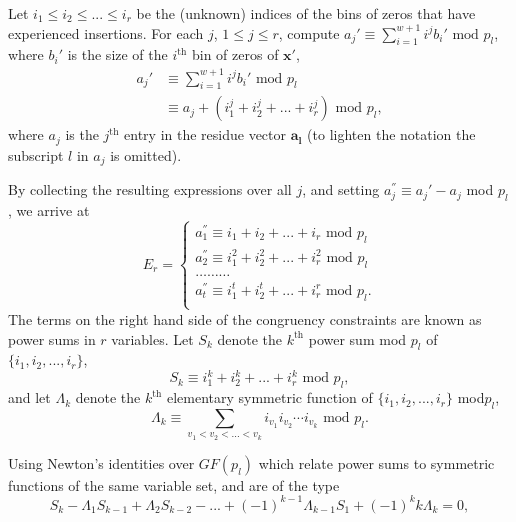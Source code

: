 \documentclass[12pt]{article} \pagestyle{plain} \topmargin
\begin{document}
Let $i_1 \leq i_2 \leq ... \leq i_r$ be the (unknown) indices of the
bins of zeros that have experienced insertions. For each $j$, $1\leq
j \leq r$, compute $a_j'\equiv \sum_{i=1}^{w+1} i^jb_i' \text{ mod }
p_l$, where $b_i'$ is the size of the $i^{\text{th}}$ bin of zeros
of $\mathbf{x'}$,
\begin{equation}\begin{array}{ll}
a_j'& \equiv \sum_{i=1}^{w+1} i^jb_i' \text{ mod } p_l\\
{}  & \equiv a_j + (i_1^j+i_2^j+...+i_r^j) \text{ mod }p_l,
\end{array}
\end{equation}
where $a_j$ is the $j^{\text{th}}$ entry in the residue vector
$\mathbf{a_l}$ (to lighten the notation the subscript $l$ in $a_j$
is omitted).

By collecting the resulting expressions over all $j$, and setting
$a_j^{''} \equiv a_j'-a_j$ mod $p_l$, we arrive at
\begin{equation}
E_r=\left\{
\begin{array}{ll}
a_1^{''} \equiv i_1+i_2+...+i_r \text{ mod }p_l\\
a_2^{''} \equiv i_1^2+i_2^2+...+i_r^2 \text{ mod }p_l\\
\dots \dots \dots\\
a_t^{''} \equiv i_1^t+i_2^t+...+i_r^r \text{ mod }p_l.\\
\end{array} \right.
\end{equation}
The terms on the right hand side of the congruency constraints are
known as power sums in $r$ variables. Let $S_k$ denote the
$k^{\text{th}}$ power sum mod $p_l$ of $\{i_1,i_2,...,i_r\}$,
\begin{equation}
S_k\equiv i_1^k+i_2^k+...+i_r^k \text{ mod }p_l,
\end{equation}
and let $\Lambda_k$ denote the $k^{\text{th}}$ elementary symmetric
function of  $\{i_1,i_2,...,i_r\}$ mod$p_l$,
\begin{equation}
\Lambda_k \equiv \sum_{v_1<v_2<...<v_k} i_{v_1}i_{v_2}\cdots
i_{v_k} \text{ mod } p_l.
\end{equation}

Using Newton's identities over $GF(p_l)$ which relate power sums
to symmetric functions of the same variable set, and are of the
type
\begin{equation}\label{newton}
S_k-\Lambda_{1}S_{k-1}+\Lambda_{2}S_{k-2}-...+(-1)^{k-1}\Lambda_{k-1}S_{1}+(-1)^kk\Lambda_{k}
=0,
\end{equation}
\end{document}
